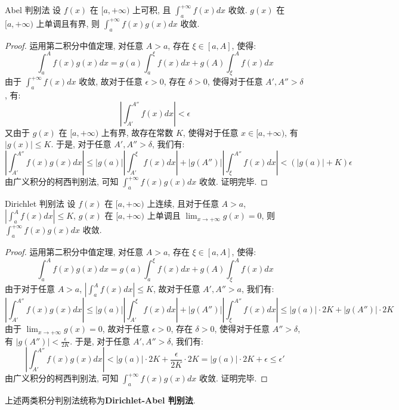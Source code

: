 \documentclass[a4paper,12pt]{ctexart}
\begin{document}
\begin{mythm}{Abel 判别法}{}
设 $f(x)$ 在 $[a,+\infty)$ 上可积, 且 $\int_a^{+\infty} f(x) dx$ 收敛. $g(x)$ 在 $[a,+\infty)$ 上单调且有界, 则 $\int_a^{+\infty} f(x)g(x) dx$ 收敛.
\end{mythm}

\begin{proof}
运用第二积分中值定理, 对任意 $A > a$, 存在 $\xi \in [a,A]$, 使得:
$$
\int_a^A f(x)g(x) dx = g(a) \int_a^{\xi} f(x) dx + g(A) \int_{\xi}^A f(x) dx
$$
由于 $\int_a^{+\infty} f(x) dx$ 收敛, 故对于任意 $\epsilon > 0$, 存在 $\delta > 0$, 使得对于任意 $A', A'' > \delta$, 有:
$$
\left| \int_{A'}^{A''} f(x) dx \right| < \epsilon
$$
又由于 $g(x)$ 在 $[a,+\infty)$ 上有界,
故存在常数 $K$, 使得对于任意 $x \in [a,+\infty)$, 有 $|g(x)| \le K$. 于是, 对于任意 $A', A'' > \delta$, 我们有:
$$
\left| \int_{A'}^{A''} f(x)g(x) dx \right| \leq |g(a)| \left| \int_{A'}^{\xi} f(x) dx \right| + |g(A'')| \left| \int_{\xi}^{A''} f(x) dx \right| < (|g(a)| + K) \epsilon
$$
由广义积分的柯西判别法, 可知 $\int_a^{+\infty} f(x)g(x) dx$ 收敛. 证明完毕.
\end{proof}

\begin{mythm}{Dirichlet 判别法}{}
设 $f(x)$ 在 $[a,+\infty)$ 上连续, 且对于任意 $A > a$, $\left| \int_a^A f(x) dx \right| \le K$, $g(x)$ 在 $[a,+\infty)$ 上单调且 $\lim_{x \to +\infty} g(x) = 0$, 则 $\int_a^{+\infty} f(x)g(x) dx$ 收敛.
\end{mythm}

\begin{proof}
运用第二积分中值定理, 对任意 $A > a$, 存在 $\xi \in [a,A]$, 使得:
$$
\int_a^A f(x)g(x) dx = g(a) \int_a^{\xi} f(x) dx + g(A) \int_{\xi}^A f(x) dx
$$
由于对于任意 $A > a$, $\left| \int_a^A f(x) dx \right| \le K$, 故对于任意 $A', A'' > a$, 我们有:
$$
\left| \int_{A'}^{A''} f(x)g(x) dx \right| \leq |g(a)| \left| \int_{A'}^{\xi} f(x) dx \right| + |g(A'')| \left| \int_{\xi}^{A''} f(x) dx \right| \leq |g(a)| \cdot 2K + |g(A'')| \cdot 2K
$$
由于 $\lim_{x \to +\infty} g(x) = 0$, 故对于任意 $\epsilon > 0$, 存在 $\delta > 0$, 使得对于任意 $A'' > \delta$, 有 $|g(A'')| < \frac{\epsilon}{2K}$. 于是, 对于任意 $A', A'' > \delta$, 我们有:
$$
\left| \int_{A'}^{A''} f(x)g(x) dx \right| < |g(a)| \cdot 2K + \frac{\epsilon}{2K} \cdot 2K = |g(a)| \cdot 2K + \epsilon \leq \epsilon'
$$
由广义积分的柯西判别法, 可知 $\int_a^{+\infty} f(x)g(x) dx$ 收敛. 证明完毕.
\end{proof}

上述两类积分判别法统称为\textbf{Dirichlet-Abel 判别法}.
\end{document}
